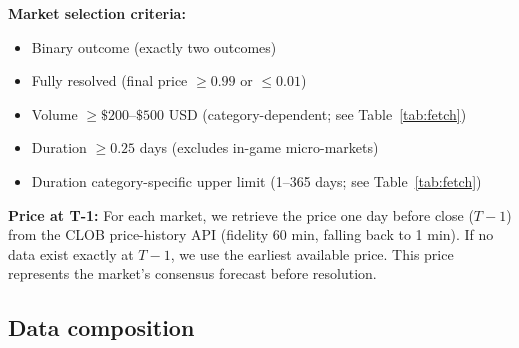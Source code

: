 \documentclass[11pt,a4paper]{article}
\begin{document}
\textbf{Market selection criteria:}
\begin{itemize}[noitemsep]
  \item Binary outcome (exactly two outcomes)
  \item Fully resolved (final price $\geq 0.99$ or $\leq 0.01$)
  \item Volume $\geq \$200$--$\$500$ USD (category-dependent; see Table~\ref{tab:fetch})
  \item Duration $\geq 0.25$ days (excludes in-game micro-markets)
  \item Duration category-specific upper limit (1--365 days; see Table~\ref{tab:fetch})
\end{itemize}

\textbf{Price at T-1:}
For each market, we retrieve the price one day before close ($T-1$) from the
CLOB price-history API (fidelity 60 min, falling back to 1 min).
If no data exist exactly at $T-1$, we use the earliest available price.
This price represents the market's consensus forecast before resolution.

\subsection{Data composition}
\end{document}
